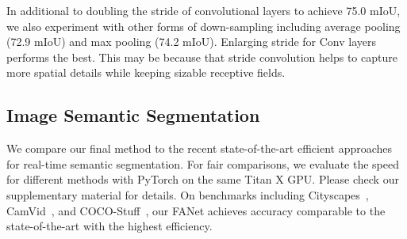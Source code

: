  
 

In additional to doubling the stride of convolutional layers to achieve 75.0 mIoU, we also experiment with other forms of down-sampling including average pooling (72.9 mIoU) and max pooling (74.2 mIoU). Enlarging stride for Conv layers performs the best.
This may be because that stride convolution helps to capture more spatial details while keeping sizable receptive fields.

 
 


\subsection{Image Semantic Segmentation}
We compare our final method to the recent state-of-the-art efficient approaches for real-time semantic segmentation. For fair comparisons, we evaluate the speed for different methods with PyTorch on the same Titan X GPU. 
Please check our supplementary material for details.
On benchmarks including Cityscapes~\cite{cordts2016cityscapes}, CamVid~\cite{brostow2008segmentation}, and COCO-Stuff~\cite{caesar2018coco}, our FANet achieves accuracy comparable to the state-of-the-art with the highest efficiency. 




